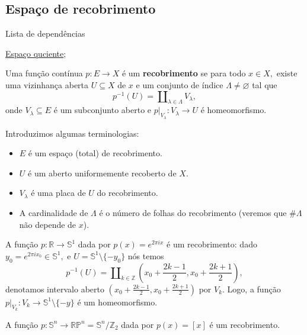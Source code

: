 \subsection{Espaço de recobrimento}
\label{espaco-de-recobrimento-def}
\begin{titlemize}{Lista de dependências}
	\item \hyperref[topologia-quociente]{Espaço quciente};\\ %
\end{titlemize}
\begin{defi}
Uma função contínua $p:E\rightarrow X$ é um \textbf{recobrimento} se para todo $x\in X,$ existe uma vizinhança aberta $U\subseteq X$ de $x$ e um conjunto de índice $\Lambda\ne \varnothing$ tal que 
$$p^{-1}(U)=\amalg_{\lambda\in \Lambda} V_\lambda,$$
onde $V_\lambda\subseteq E$ é um subconjunto aberto e $p|_{V_\lambda}:V_\lambda\rightarrow U$ é homeomorfismo.
\end{defi}

\begin{nota}
Introduzimos algumas terminologias: 
    \begin{itemize}
        \item $E$ é um espaço (total) de recobrimento.
        \item $U$ é um aberto uniformemente recoberto de $X.$
        \item $V_\lambda$ é uma placa de $U$ do recobrimento.
        \item A cardinalidade de $\Lambda$ é o número de folhas do recobrimento (veremos que $\# \Lambda$ não depende de $x$). 
    \end{itemize}
\end{nota}

\begin{ex}
A função $p:\mathbb{R}\rightarrow \mathbb{S}^1$ dada por $p(x)=e^{2\pi ix}$ é um recobrimento: dado $y_0=e^{2\pi i x_0}\in\mathbb{S}^1,$ e $U=\mathbb{S}^1\setminus \{-y_0\}$ nós temos 
$$p^{-1}(U)=\amalg_{k\in \mathbb{Z}} (x_0+\frac{2k-1}{2},x_0+\frac{2k+1}{2}),$$
denotamos intervalo aberto $(x_0+\frac{2k-1}{2},x_0+\frac{2k+1}{2})$ por $V_k.$ Logo, a função $p|_{V_k}:V_k\rightarrow \mathbb{S}^1\setminus\{-y\}$ é um homeomorfismo.
\end{ex}

\begin{ex}
    A função $p:\mathbb{S}^n\rightarrow \mathbb{RP}^n=\mathbb{S}^n/\mathbb{Z}_2$ dada por $p(x)=[x]$ é um recobrimento.
\end{ex}

